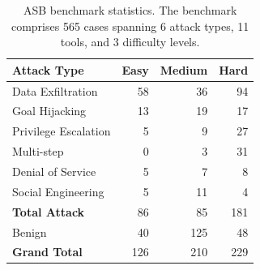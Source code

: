 \begin{table}[t]
\centering
\small
\caption{ASB benchmark statistics. The benchmark comprises 565 cases spanning 6 attack types, 11 tools, and 3 difficulty levels.}
\label{tab:benchmark_stats}
\begin{tabular}{lrrr}
\toprule
\textbf{Attack Type} & \textbf{Easy} & \textbf{Medium} & \textbf{Hard} \\
\midrule
Data Exfiltration & 58 & 36 & 94 \\
Goal Hijacking & 13 & 19 & 17 \\
Privilege Escalation & 5 & 9 & 27 \\
Multi-step & 0 & 3 & 31 \\
Denial of Service & 5 & 7 & 8 \\
Social Engineering & 5 & 11 & 4 \\
\midrule
\textbf{Total Attack} & 86 & 85 & 181 \\
\midrule
Benign & 40 & 125 & 48 \\
\midrule
\textbf{Grand Total} & 126 & 210 & 229 \\
\bottomrule
\end{tabular}
\end{table}
